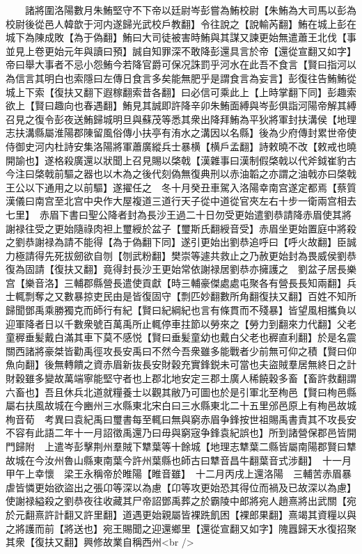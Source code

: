 　　諸將圍洛陽數月朱鮪堅守不下帝以廷尉岑彭嘗為鮪校尉【朱鮪為大司馬以彭為校尉後從邑人韓歆于河内遂歸光武校戶教翻】令往說之【說輸芮翻】鮪在城上彭在城下為陳成敗【為于偽翻】鮪曰大司徒被害時鮪與其謀又諫更始無遣蕭王北伐【事並見上卷更始元年與讀曰預】誠自知罪深不敢降彭還具言於帝【還從宣翻又如字】帝曰舉大事者不忌小怨鮪今若降官爵可保况誅罰乎河水在此吾不食言【賢曰指河以為信言其明白也索隱曰左傳日食言多矣能無肥乎是謂食言為妄言】彭復往告鮪鮪從城上下索【復扶又翻下遐稼翻索昔各翻】曰必信可乘此上【上時掌翻下同】彭趣索欲上【賢曰趣向也春遇翻】鮪見其誠即許降辛卯朱鮪面縛與岑彭俱詣河陽帝解其縛召見之復令彭夜送鮪歸城明旦與蘇茂等悉其衆出降拜鮪為平狄將軍封扶溝侯【地理志扶溝縣屬淮陽郡陳留風俗傳小扶亭有洧水之溝因以名縣】後為少府傳封累世帝使侍御史河内杜詩安集洛陽將軍蕭廣縱兵士暴横【横戶孟翻】詩敕曉不改【敕戒也曉開諭也】遂格殺廣還以狀聞上召見賜以棨戟【漢雜事曰漢制假棨戟以代斧鉞崔豹古今注曰棨戟前驅之器也以木為之後代刻偽無復典刑以赤油韜之亦謂之油戟亦曰棨戟王公以下通用之以前驅】遂擢任之　冬十月癸丑車駕入洛陽幸南宫遂定都焉【蔡質漢儀曰南宫至北宫中央作大屋複道三道行天子從中道從官夾左右十步一衛兩宫相去七里】　赤眉下書曰聖公降者封為長沙王過二十日勿受更始遣劉恭請降赤眉使其將謝禄往受之更始隨祿肉袒上璽綬於盆子【璽斯氏翻綬音受】赤眉坐更始置庭中將殺之劉恭謝禄為請不能得【為于偽翻下同】遂引更始出劉恭追呼曰【呼火故翻】臣誠力極請得先死拔劒欲自刎【刎武粉翻】樊崇等遽共救止之乃赦更始封為畏威侯劉恭復為固請【復扶又翻】竟得封長沙王更始常依謝禄居劉恭亦擁護之　劉盆子居長樂宫【樂音洛】三輔郡縣營長遣使貢獻【時三輔豪傑處處屯聚各有營長長知兩翻】兵士輒剽奪之又數暴掠吏民由是皆復固守【剽匹妙翻數所角翻復扶又翻】百姓不知所歸聞鄧禹乘勝獨克而師行有紀【賢曰紀綱紀也言有條貫而不殘暴】皆望風相攜負以迎軍降者日以千數衆號百萬禹所止輒停車拄節以勞來之【勞力到翻來力代翻】父老童稺垂髪戴白滿其車下莫不感悦【賢曰垂髪童幼也戴白父老也稺直利翻】於是名震關西諸將豪桀皆勸禹徑攻長安禹曰不然今吾衆雖多能戰者少前無可仰之積【賢曰仰魚向翻】後無轉饋之資赤眉新抜長安財穀充實鋒鋭未可當也夫盜賊羣居無終日之計財穀雖多變故萬端寧能堅守者也上郡北地安定三郡土廣人稀饒穀多畜【畜許救翻謂六畜也】吾且休兵北道就糧養士以觀其敝乃可圖也於是引軍北至栒邑【賢曰栒邑縣屬右扶風故城在今豳州三水縣東北宋白曰三水縣東北二十五里邠邑原上有栒邑故城栒音荀　考異曰袁紀禹曰璽書每至輒曰無與窮赤眉争鋒按世祖賜禹書責其不攻長安不容有此語二年十一月詔徵禹還乃曰毋與窮宼争鋒袁紀誤也】所到諸營保郡邑皆開門歸附　上遣岑彭擊荆州羣賊下犨葉等十餘城【地理志犨葉二縣皆屬南陽郡賢曰犨故城在今汝州魯山縣東南葉今許州葉縣也師古曰犨音昌牛翻葉音式涉翻】　十一月甲午上幸懷　梁王永稱帝於睢陽【睢音雖】　十二月丙戌上還洛陽　三輔苦赤眉暴虐皆憐更始欲盜出之張卬等深以為慮【卬等攻更始恐其得位而禍及已故深以為慮】使謝禄縊殺之劉恭夜往收藏其尸帝詔鄧禹葬之於霸陵中郎將宛人趙熹將出武關【宛於元翻熹許計翻又許里翻】道遇更始親屬皆裸跣飢困【裸郎果翻】熹竭其資糧以與之將護而前【將送也】宛王賜聞之迎還鄉里【還從宣翻又如字】隗囂歸天水復招聚其衆【復扶又翻】興修故業自稱西州<br />
